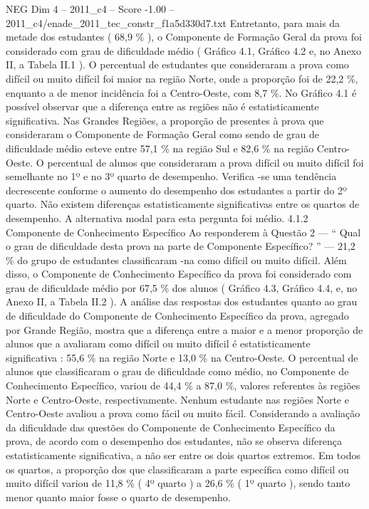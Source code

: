 \begin{textsample}{NEG Dim 4 – 2011\_c4 – Score -1.00 – 2011\_c4/enade\_2011\_tec\_constr\_f1a5d330d7.txt}
Entretanto, para mais da metade dos estudantes ( 68,9 \% ), o Componente de Formação Geral da prova foi considerado com grau de dificuldade médio ( Gráfico 4.1, Gráfico 4.2 e, no Anexo II, a Tabela II.1 ).
O percentual de estudantes que consideraram a prova como difícil ou muito difícil foi maior na região Norte, onde a proporção foi de 22,2 \%, enquanto a de menor incidência foi a Centro-Oeste, com 8,7 \%.
No Gráfico 4.1 é possível observar que a diferença entre as regiões não é estatisticamente significativa.
Nas Grandes Regiões, a proporção de presentes à prova que consideraram o Componente de Formação Geral como sendo de grau de dificuldade médio esteve entre 57,1 \% na região Sul e 82,6 \% na região Centro-Oeste.
O percentual de alunos que consideraram a prova difícil ou muito difícil foi semelhante no 1º e no 3º quarto de desempenho.
Verifica -se uma tendência decrescente conforme o aumento do desempenho dos estudantes a partir do 2º quarto.
Não existem diferenças estatisticamente significativas entre os quartos de desempenho.
A alternativa modal para esta pergunta foi médio. 4.1.2 Componente de Conhecimento Específico Ao responderem à Questão 2 — “ Qual o grau de dificuldade desta prova na parte de Componente Específico? ” — 21,2 \% do grupo de estudantes classificaram -na como difícil ou muito difícil.
Além disso, o Componente de Conhecimento Específico da prova foi considerado com grau de dificuldade médio por 67,5 \% dos alunos ( Gráfico 4.3, Gráfico 4.4, e, no Anexo II, a Tabela II.2 ).
A análise das respostas dos estudantes quanto ao grau de dificuldade do Componente de Conhecimento Específico da prova, agregado por Grande Região, mostra que a diferença entre a maior e a menor proporção de alunos que a avaliaram como difícil ou muito difícil é estatisticamente significativa : 55,6 \% na região Norte e 13,0 \% na Centro-Oeste.
O percentual de alunos que classificaram o grau de dificuldade como médio, no Componente de Conhecimento Específico, variou de 44,4 \% a 87,0 \%, valores referentes às regiões Norte e Centro-Oeste, respectivamente.
Nenhum estudante nas regiões Norte e Centro-Oeste avaliou a prova como fácil ou muito fácil.
Considerando a avaliação da dificuldade das questões do Componente de Conhecimento Específico da prova, de acordo com o desempenho dos estudantes, não se observa diferença estatisticamente significativa, a não ser entre os dois quartos extremos.
Em todos os quartos, a proporção dos que classificaram a parte específica como difícil ou muito difícil variou de 11,8 \% ( 4º quarto ) a 26,6 \% ( 1º quarto ), sendo tanto menor quanto maior fosse o quarto de desempenho.

\end{textsample}
